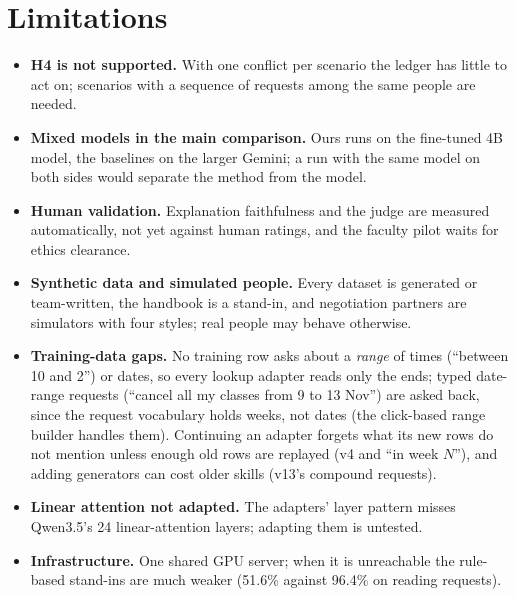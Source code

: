\documentclass[11pt,a4paper]{article}
\begin{document}
\section{Limitations}
\label{sec:limits}
\begin{itemize}
\item \textbf{H4 is not supported.} With one conflict per scenario the ledger has little to act on; scenarios with a
sequence of requests among the same people are needed.
\item \textbf{Mixed models in the main comparison.} Ours runs on the fine-tuned 4B model, the baselines on the larger
Gemini; a run with the same model on both sides would separate the method from the model.
\item \textbf{Human validation.} Explanation faithfulness and the judge are measured automatically, not yet against
human ratings, and the faculty pilot waits for ethics clearance.
\item \textbf{Synthetic data and simulated people.} Every dataset is generated or team-written, the handbook is a
stand-in, and negotiation partners are simulators with four styles; real people may behave otherwise.
\item \textbf{Training-data gaps.} No training row asks about a \emph{range} of times (``between 10 and 2'') or dates,
so every lookup adapter reads only the ends; typed date-range requests (``cancel all my classes from 9 to 13 Nov'')
are asked back, since the request vocabulary holds weeks, not dates (the click-based range builder handles them).
Continuing an adapter forgets what its new rows do not mention unless enough old rows are replayed (v4 and
``in week $N$''), and adding generators can cost older skills (v13's compound requests).
\item \textbf{Linear attention not adapted.} The adapters' layer pattern misses Qwen3.5's 24 linear-attention layers;
adapting them is untested.
\item \textbf{Infrastructure.} One shared GPU server; when it is unreachable the rule-based stand-ins are much weaker
(51.6\% against 96.4\% on reading requests).
\end{itemize}

\end{document}
